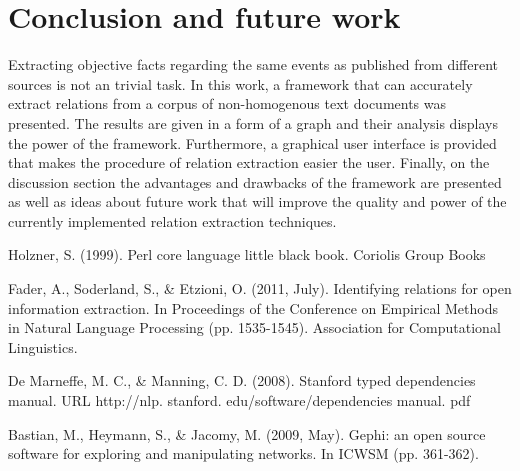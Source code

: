 \documentclass[]{article}
\begin{document}
\section{Conclusion and future work}
%
Extracting objective facts regarding the same events as published from different sources is not an trivial task. In this work, a framework that can accurately extract relations from a corpus of non-homogenous text documents was presented. The results are given in a form of a graph and their analysis displays the power of the framework. Furthermore, a graphical user interface is provided that makes  the procedure of relation extraction easier the user. Finally, on the discussion section the advantages and drawbacks of the framework are presented as well as ideas about future work that will improve the quality and power of the currently implemented relation extraction techniques.
%
%
\begin{thebibliography}{99}
%

Holzner, S. (1999). Perl core language little black book. Coriolis Group Books

Fader, A., Soderland, S., \& Etzioni, O. (2011, July). Identifying relations for open information extraction. In Proceedings of the Conference on Empirical Methods in Natural Language Processing (pp. 1535-1545). Association for Computational Linguistics.

De Marneffe, M. C., \& Manning, C. D. (2008). Stanford typed dependencies manual. URL http://nlp. stanford. edu/software/dependencies manual. pdf

Bastian, M., Heymann, S., \& Jacomy, M. (2009, May). Gephi: an open source software for exploring and manipulating networks. In ICWSM (pp. 361-362).


\end{thebibliography}
\end{document}
